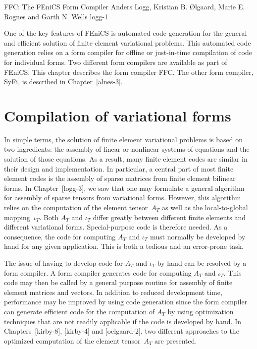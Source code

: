               {FFC: The FEniCS Form Compiler}
              {Anders Logg, Kristian B. \O{}lgaard, Marie E. Rognes and Garth N. Wells}
              {logg-1}

\newcommand{\commandline}[1]{\medskip\noindent\framebox[\textwidth][l]{\texttt{#1}}\medskip}

One of the key features of FEniCS is automated code generation for the
general and efficient solution of finite element variational
problems. This automated code generation relies on a form compiler for
offline or just-in-time compilation of code for individual forms. Two
different form compilers are available as part of FEniCS. This chapter
describes the form compiler FFC. The other form compiler, SyFi, is
described in Chapter~[alnes-3].

\section{Compilation of variational forms}

In simple terms, the solution of finite element variational problems
is based on two ingredients: the assembly of linear or nonlinear
systems of equations and the solution of those equations. As a result,
many finite element codes are similar in their design and
implementation. In particular, a central part of most finite element
codes is the assembly of sparse matrices from finite element bilinear
forms. In Chapter~[logg-3], we saw that one may formulate a general
algorithm for assembly of sparse tensors from variational
forms. However, this algorithm relies on the computation of the
element tensor~$A_T$ as well as the local-to-global mapping~$\iota_T$.
Both $A_T$ and $\iota_T$ differ greatly between different finite
elements and different variational forms. Special-purpose code is
therefore needed. As a consequence, the code for computing $A_T$ and
$\iota_T$ must normally be developed by hand for any given
application. This is both a tedious and an error-prone task.

The issue of having to develop code for $A_T$ and $\iota_T$ by hand
can be resolved by a form compiler. A form compiler generates code for
computing $A_T$ and $\iota_T$. This code may then be called by a
general purpose routine for assembly of finite element matrices and
vectors. In addition to reduced development time, performance may be
improved by using code generation since the form compiler can generate
efficient code for the computation of $A_T$ by using optimization
techniques that are not readily applicable if the code is developed by
hand. In Chapters~[kirby-8], [kirby-4] and [oelgaard-2], two different
approaches to the optimized computation of the element tensor~$A_T$
are presented.

